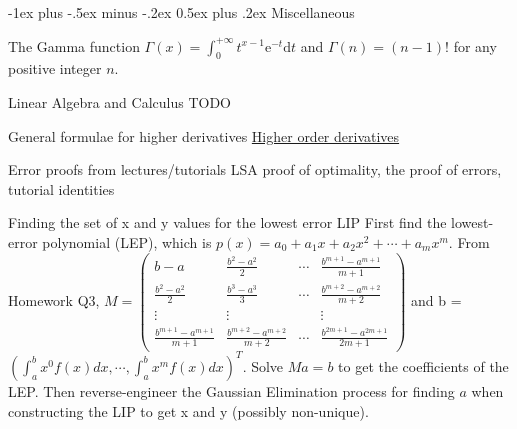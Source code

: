 \documentclass[10pt,landscape]{article}
\makeatletter
\renewcommand{\section}{\@startsection{section}{1}{0mm}%
                                {-1ex plus -.5ex minus -.2ex}%
                                {0.5ex plus .2ex}%
                                {\normalfont\large\bfseries}}
\theoremstyle{definition}
\newcommand{\thistheoremname}{}
\newtheorem*{genericthm*}{\thistheoremname}
\newenvironment{namedthm*}[1]
{\renewcommand{\thistheoremname}{#1}\begin{genericthm*}}
{\end{genericthm*}}
\makeatother
\begin{document}
\begin{multicols}{3}
	\section{Miscellaneous}
	\begin{namedthm*}{The Gamma function} \(\Gamma(x)=\int_{0}^{+\infty} t^{x-1} \mathrm{e}^{-t} \mathrm{d} t\) and \(\Gamma(n)=(n-1) !\) for any positive integer \(n\).
	\end{namedthm*}
	\begin{namedthm*}{Linear Algebra and Calculus}
		\color{red} TODO
	\end{namedthm*}
	\begin{namedthm*}{General formulae for higher derivatives}
		\hyperref{https://www.math24.net/higher-order-derivatives/}{}{}{Higher order derivatives}
	\end{namedthm*}
	\begin{namedthm*}{Error proofs from lectures/tutorials}
		\color{red} LSA proof of optimality, the proof of errors, tutorial identities
	\end{namedthm*}
	\begin{namedthm*}{Finding the set of x and y values for the lowest error LIP}
		First find the lowest-error polynomial (LEP), which is \(p(x)=a_{0}+a_{1} x+a_{2} x^{2}+\cdots+a_{m} x^{m}\). From Homework Q3, \(M=\left(\begin{array}{cccc}{b-a} & {\frac{b^{2}-a^{2}}{2}} & {\cdots} & {\frac{b^{m+1}-a^{m+1}}{m+1}} \\ {\frac{b^{2}-a^{2}}{2}} & {\frac{b^{3}-a^{3}}{3}} & {\cdots} & {\frac{b^{m+2}-a^{m+2}}{m+2}} \\ {\vdots} & {\vdots} & {} & {\vdots} \\ {\frac{b^{m+1}-a^{m+1}}{m+1}} & {\frac{b^{m+2}-a^{m+2}}{m+2}} & {\cdots} & {\frac{b^{2 m+1}-a^{2 m+1}}{2 m+1}}\end{array}\right)\) and b = \(\left(\int_{a}^{b} x^{0} f(x) d x, \cdots, \int_{a}^{b} x^{m} f(x) d x\right)^{T}\). Solve \(Ma = b\) to get the coefficients of the LEP. Then reverse-engineer the Gaussian Elimination process for finding \(a\) when constructing the LIP to get x and y (possibly non-unique).
	\end{namedthm*}

\end{multicols}
\end{document}
